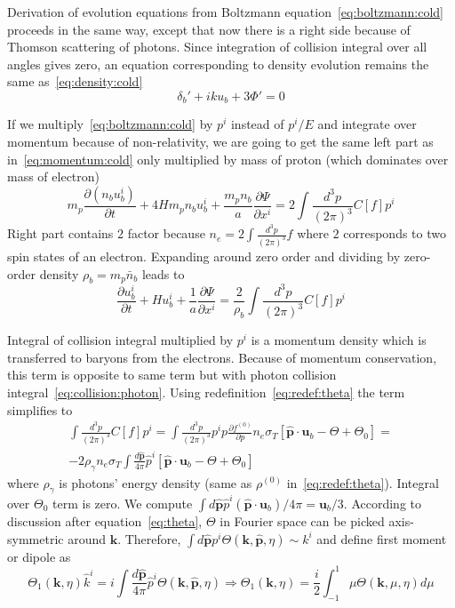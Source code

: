 \documentclass[12pt]{extarticle}
\numberwithin{problem}{section}
\numberwithin{theorem}{section}
\begin{document}
	Derivation of evolution equations from Boltzmann equation~\ref{eq:boltzmann:cold} proceeds in the same way, except that now there is a right side because of Thomson scattering of photons. Since integration of collision integral over all angles gives zero, an equation corresponding to density evolution remains the same as~\ref{eq:density:cold}
	\begin{equation}
		\delta_b' + iku_b + 3\Phi' = 0		
	\end{equation}

	If we multiply~\ref{eq:boltzmann:cold} by $p^i$ instead of $p^i/E$ and integrate over momentum because of non-relativity, we are going to get the same left part as in~\ref{eq:momentum:cold} only multiplied by mass of proton (which dominates over mass of electron)
	\begin{equation}
		m_p\frac{\partial(n_bu_b^i)}{\partial t} + 4Hm_pn_bu_b^i + \frac{m_pn_b}{a}\frac{\partial \Psi}{\partial x^i} = 2\int \frac{d^3p}{(2\pi)^3} C[f]p^i
	\end{equation}
	Right part contains $2$ factor because $n_e = 2\int\frac{d^3p}{(2\pi)^3}f$ where $2$ corresponds to two spin states of an electron. Expanding around zero order and dividing by zero-order density $\rho_b = m_p\bar{n}_b$ leads to
	\begin{equation}
		\frac{\partial u^i_b}{\partial t} + Hu^i_b + \frac{1}{a}\frac{\partial\Psi}{\partial x^i} = \frac{2}{\rho_b}\int\frac{d^3p}{(2\pi)^3} C[f]p^i
	\end{equation}

	Integral of collision integral multiplied by $p^i$ is a momentum density which is transferred to baryons from the electrons. Because of momentum conservation, this term is opposite to same term but with photon collision integral~\ref{eq:collision:photon}. Using redefinition~\ref{eq:redef:theta} the term simplifies to
	\begin{multline}
		\int \frac{d^3p}{(2\pi)^3} C[f]p^i = \int\frac{d^3p}{(2\pi)^3} p^ip\frac{\partial f^{(0)}}{\partial p}n_e\sigma_T\left[\mathbf{\hat{p}}\cdot\mathbf{u}_b - \Theta + \Theta_0\right] =\\
		-2\rho_\gamma n_e\sigma_T\int\frac{d\mathbf{\hat{p}}}{4\pi}\hat{p}^i[\mathbf{\hat{p}}\cdot\mathbf{u}_b - \Theta + \Theta_0]
	\end{multline}
	where $\rho_\gamma$ is photons' energy density (same as $\rho^{(0)}$ in~\ref{eq:redef:theta}). Integral over $\Theta_0$ term is zero. We compute $\int d\mathbf{\hat{p}} \hat{p}^i(\mathbf{\hat{p}}\cdot\mathbf{u}_b)/4\pi = \mathbf{u}_b / 3$. According to discussion after equation~\ref{eq:theta}, $\Theta$ in Fourier space can be picked axis-symmetric around $\mathbf{k}$. Therefore, $\int d\mathbf{\hat{p}} p^i \Theta(\mathbf{k}, \mathbf{\hat{p}}, \eta)\sim k^i$ and define first moment or dipole as
	\begin{equation}
		\Theta_1(\mathbf{k}, \eta)\hat{k}^i = i\int \frac{d\mathbf{\hat{p}}}{4\pi} \hat{p}^i\Theta(\mathbf{k}, \mathbf{\hat{p}}, \eta)\Rightarrow\Theta_1(\mathbf{k}, \eta) = \frac{i}{2}\int^{1}_{-1}\mu\Theta(\mathbf{k},\mu,\eta) d\mu
	\end{equation}
	
\end{document}
